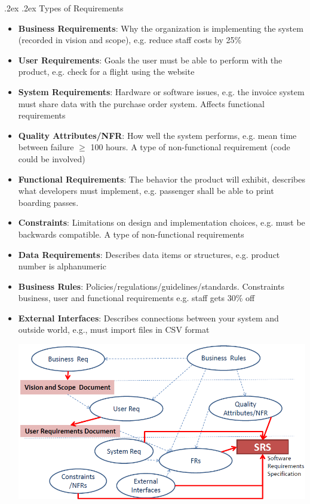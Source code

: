\documentclass[10pt,landscape,a4paper]{article}
\makeatletter
\renewcommand{\subsubsection}{\@startsection{subsubsection}{1}{0mm}%
	{.2ex}%
	{.2ex}%
	{\rmfamily\bfseries}}
\makeatother
\begin{document}
\begin{multicols*}{4}
		\subsubsection{Types of Requirements}
		\begin{itemize}
			\item \textbf{Business Requirements}: Why the organization is implementing the system (recorded in vision and scope), e.g. reduce staff costs by 25\%
			\item \textbf{User Requirements}: Goals the user must be able to perform with the product, e.g. check for a flight using the website
			\item \textbf{System Requirements}: Hardware or software issues, e.g. the invoice system must share data with the purchase order	system. Affects functional requirements
			\item \textbf{Quality Attributes/NFR}: How well the system performs, e.g. mean time between failure $\geq$ 100 hours. A type of non-functional requirement (code could be involved)
			\item \textbf{Functional Requirements}: The behavior the product will exhibit, describes what developers must implement, e.g. passenger shall be able to print boarding passes.
			\item \textbf{Constraints}: Limitations on design and implementation choices, e.g. must be backwards compatible. A type of non-functional requirements
			\item \textbf{Data Requirements}: Describes data items or structures, e.g. product number is alphanumeric
			\item \textbf{Business Rules}: Policies/regulations/guidelines/standards. Constraints business, user and functional requirements e.g. staff gets 30\% off
			\item \textbf{External Interfaces}: Describes connections between your system and outside world, e.g., must import files in CSV format
			\begin{center}
				\includegraphics[width=0.5\columnwidth]{reqs}
			\end{center}
		\end{itemize}

\end{multicols*}
\end{document}
